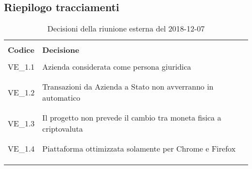 \subsection{Riepilogo tracciamenti}
\begin{centering}
\begin{longtable}{ >{\centering}p{4cm} >{\centering}p{11cm} }

\hline
\\[0.5pt]
	\textbf{Codice} & \textbf{Decisione} 
	
	\tabularnewline 
	\hline
	
	
				\\[0.5pt]
				VE\_1.1 & Azienda considerata come persona giuridica
				\\[0.5pt]
				\tabularnewline
				\hline
						
				\\[0.5pt]
				VE\_1.2 & Transazioni da Azienda a Stato non avverranno in automatico
				\\[0.5pt]
				\tabularnewline
				\hline
				
				\\[0.5pt]
				VE\_1.3 & Il progetto non prevede il cambio tra moneta fisica a criptovaluta
				\\[0.5pt]
				\tabularnewline
				\hline
								
				\\[0.5pt]
				VE\_1.4 & Piattaforma ottimizzata solamente per Chrome e Firefox
				\\[0.5pt]
				\tabularnewline
				\hline
				
                
        \\[0.7pt]
        \caption{Decisioni della riunione esterna del 2018-12-07}
\end{longtable}
\end{centering}


